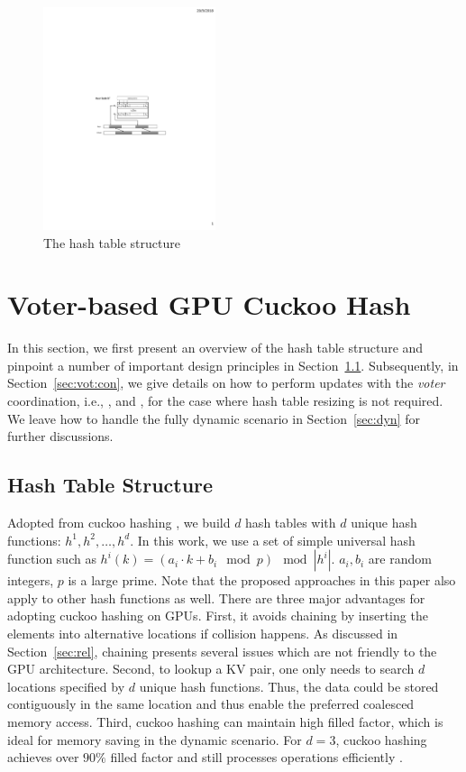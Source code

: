 
\begin{figure}[t]
	\centering
	\includegraphics[width=0.45\textwidth]{fig/Hashtable.pdf}
	\caption{The hash table structure}
	\label{fig:hashtable}
\end{figure}

\section{Voter-based GPU Cuckoo Hash}\label{sec:vot}
In this section, we first present an overview of the hash table structure and pinpoint a number of important design principles in Section~\ref{sec:vot:has}.
Subsequently, in Section~\ref{sec:vot:con}, we give details on how to perform updates with the \emph{voter} coordination, i.e., ,  and , for the case where hash table resizing is not required. 
We leave how to handle the fully dynamic scenario in Section~\ref{sec:dyn} for further discussions. 

\subsection{Hash Table Structure}\label{sec:vot:has}
Adopted from cuckoo hashing \cite{pagh2004cuckoo}, we build $d$ hash tables with $d$ unique hash functions: $h^1,h^2,\ldots,h^d$. 
In this work, we use a set of simple universal hash function such as $h^i(k) = (a_i\cdot k + b_i \mod p) \mod |h^i|$.
$a_i,b_i$ are random integers, $p$ is a large prime.
Note that the proposed approaches in this paper also apply to other hash functions as well. 
There are three major advantages for adopting cuckoo hashing on GPUs. 
First, it avoids chaining by inserting the elements into alternative locations if collision happens. As discussed in Section~\ref{sec:rel}, 
chaining presents several issues which are not friendly to the GPU architecture.  
Second, to lookup a KV pair, one only needs to search $d$ locations specified by $d$ unique hash functions. 
Thus, the data could be stored contiguously in the same location and thus enable the preferred coalesced memory access. 
Third, cuckoo hashing can maintain high filled factor, which is ideal for memory saving in the dynamic scenario. 
For $d=3$, cuckoo hashing achieves over $90\%$ filled factor and still processes  operations efficiently \cite{fotakis2005space}.


